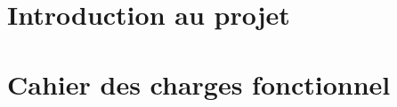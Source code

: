 \documentclass[12pt,fleqn]{book} %
\begin{document}
\renewcommand{\contentsname}{Sommaire}                %
\renewcommand{\glossaryname}{Glossaire}               %




\newpage


\tableofcontents  %
\cleardoublepage  %

\frontmatter      %



\mainmatter       %

\part{Introduction au projet}





\part{Cahier des charges fonctionnel}


\end{document}
